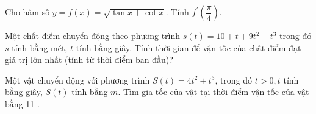 \begin{ex}%
Cho hàm số $y=f(x)=\sqrt{\tan x+\cot x}$. Tính $f^{\prime}\left(\dfrac{\pi}{4}\right)$.\\
\end{ex}

\begin{ex}%
Một chất điểm chuyển động theo phương trình $s(t)=10+t+9 t^2-t^3$ trong đó $s$ tính bằng mét, $t$ tính bằng giây. Tính thời gian để vận tốc của chất điểm đạt giá trị lớn nhất (tính từ thời điểm ban đầu)?\\
\end{ex}

\begin{ex}%
Một vật chuyển động với phương trình $S(t)=4 t^2+t^3$, trong đó $t>0, t$ tính bằng giây, $S(t)$ tính bằng $m$. Tìm gia tốc của vật tại thời điểm vận tốc của vật bằng 11 .\\
\end{ex}
	








	
